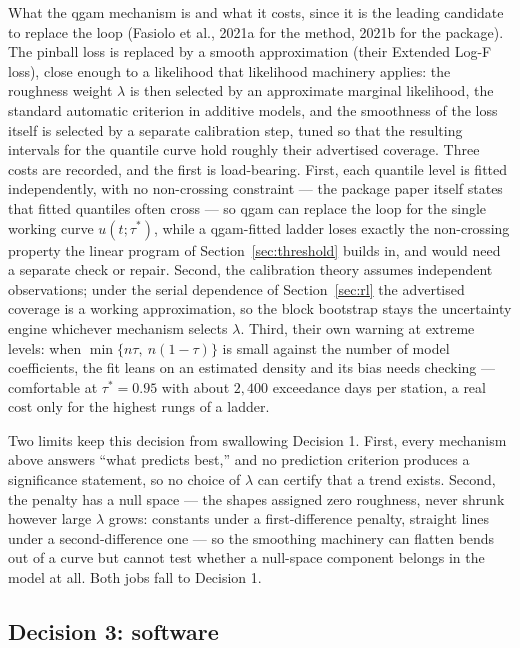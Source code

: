 \documentclass[11pt]{article}
\begin{document}
{\color{green}What the qgam mechanism is and what it costs, since it is the leading candidate to replace the loop (Fasiolo et al., 2021a for the method, 2021b for the package). The pinball loss is replaced by a smooth approximation (their Extended Log-F loss), close enough to a likelihood that likelihood machinery applies: the roughness weight $\lambda$ is then selected by an approximate marginal likelihood, the standard automatic criterion in additive models, and the smoothness of the loss itself is selected by a separate calibration step, tuned so that the resulting intervals for the quantile curve hold roughly their advertised coverage. Three costs are recorded, and the first is load-bearing. First, each quantile level is fitted independently, with no non-crossing constraint --- the package paper itself states that fitted quantiles often cross --- so qgam can replace the loop for the single working curve $u(t; \tau^{*})$, while a qgam-fitted ladder loses exactly the non-crossing property the linear program of Section~\ref{sec:threshold} builds in, and would need a separate check or repair. Second, the calibration theory assumes independent observations; under the serial dependence of Section~\ref{sec:rl} the advertised coverage is a working approximation, so the block bootstrap stays the uncertainty engine whichever mechanism selects $\lambda$. Third, their own warning at extreme levels: when $\min\{n\tau,\ n(1-\tau)\}$ is small against the number of model coefficients, the fit leans on an estimated density and its bias needs checking --- comfortable at $\tau^{*} = 0.95$ with about $2{,}400$ exceedance days per station, a real cost only for the highest rungs of a ladder.}

Two limits keep this decision from swallowing Decision 1. First, every mechanism above answers ``what predicts best,'' and no prediction criterion produces a significance statement, so no choice of $\lambda$ can certify that a trend exists. Second, the penalty has a null space --- the shapes assigned zero roughness, never shrunk however large $\lambda$ grows: constants under a first-difference penalty, straight lines under a second-difference one --- so the smoothing machinery can flatten bends out of a curve but cannot test whether a null-space component belongs in the model at all. Both jobs fall to Decision 1.

\subsection{Decision 3: software}\label{sec:software}
\end{document}
